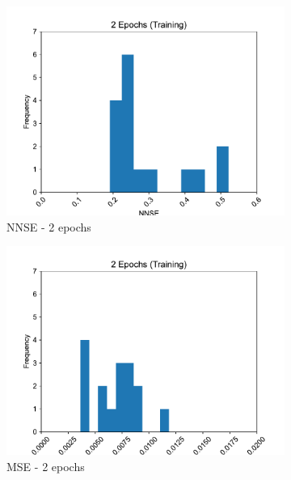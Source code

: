\documentclass[11pt,twocolumn]{article}
\begin{document}
\begin{figure}[p]
     \centering
     \begin{subfigure}[b]{0.49\textwidth}
        \centering\includegraphics[width=1.0\linewidth]{images/2_training-NNSE.pdf}
        \caption{NNSE - 2 epochs}
        \label{fig:tbd1}
     \end{subfigure}
     \hfill
     \begin{subfigure}[b]{0.49\textwidth}
        \centering\includegraphics[width=1.0\linewidth]{images/2_training-MSE.pdf}
        \caption{MSE - 2 epochs}
        \label{fig:tbd2}
     \end{subfigure}
     \hfill
     \newline
     \begin{subfigure}[b]{0.49\textwidth}

\end{subfigure}
\end{figure}
\end{document}
